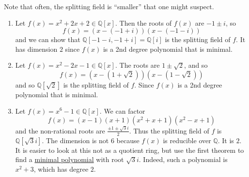   \begin{example}
    \label{ex:slightly-harder-computation-of-splitting-fields}
    Note that often, the splitting field is ``smaller'' that one might suspect. 
    \begin{enumerate}
      \item Let $f(x) = x^2 + 2x + 2 \in \mathbb{Q}[x]$. Then the roots of $f(x)$ are $-1 \pm i$, so 
      \begin{equation}
        f(x) = (x - (-1 + i)) (x - (-1 - i)) 
      \end{equation}
      and we can show that $\mathbb{Q}[-1 - i, -1+i] = \mathbb{Q}[i]$ is the splitting field of $f$. It has dimension $2$ since $f(x)$ is a 2nd degree polynomial that is minimal. 

      \item Let $f(x) = x^2 - 2x - 1 \in \mathbb{Q}[x]$. The roots are $1 \pm \sqrt{2}$, and so 
      \begin{equation}
        f(x) = (x - (1 + \sqrt{2})) (x - (1 - \sqrt{2}))
      \end{equation}
      and so $\mathbb{Q}[\sqrt{2}]$ is the splitting field of $f$. Since $f(x)$ is a 2nd degree polynomial that is minimal. 

      \item Let $f(x) = x^6 - 1 \in \mathbb{Q}[x]$. We can factor 
      \begin{equation}
        f(x) = (x-1) (x + 1) (x^2 + x + 1) (x^2 - x + 1)
      \end{equation} 
      and the non-rational roots are $\frac{\pm 1 \pm \sqrt{3} i}{2}$. Thus the splitting field of $f$ is $\mathbb{Q}[\sqrt{3} i]$. The dimension is not 6 because $f(x)$ is reducible over $\mathbb{Q}$. It is $2$. It is easier to look at this not as a quotient ring, but use the first theorem to find a \hyperref[def:min_poly]{minimal polynomial} with root $\sqrt{3} i$. Indeed, such a polynomial is $x^2 + 3$, which has degree $2$. 


\end{enumerate}
\end{example}
